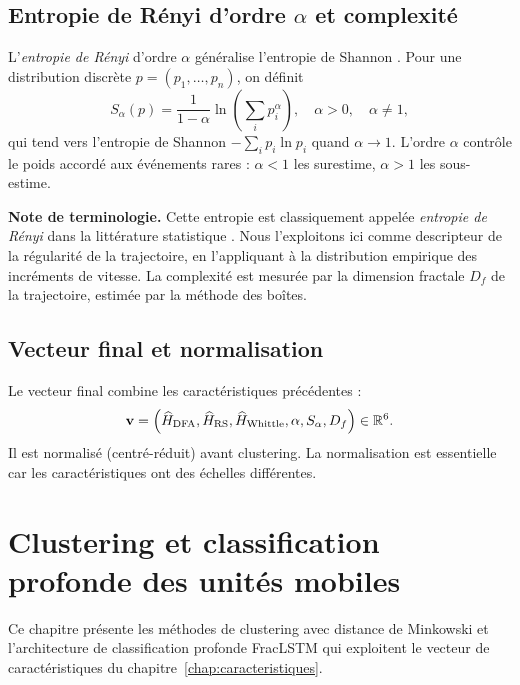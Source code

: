 \section{Entropie de Rényi d'ordre $\alpha$ et complexité}
\label{sec:entropie}
L'\emph{entropie de Rényi} d'ordre $\alpha$ généralise l'entropie de Shannon \cite{renyi1961}. Pour une distribution discrète $p = (p_1, \dots, p_n)$, on définit
\begin{equation}
S_\alpha(p) = \frac{1}{1-\alpha} \ln \left( \sum_i p_i^\alpha \right), \quad \alpha > 0, \quad \alpha \neq 1,
\end{equation}
qui tend vers l'entropie de Shannon $-\sum_i p_i \ln p_i$ quand $\alpha \to 1$. L'ordre $\alpha$ contrôle le poids accordé aux événements rares : $\alpha < 1$ les surestime, $\alpha > 1$ les sous-estime.

\medskip
\textbf{Note de terminologie.} Cette entropie est classiquement appelée \emph{entropie de Rényi} dans la littérature statistique \cite{renyi1961}. Nous l'exploitons ici comme descripteur de la régularité de la trajectoire, en l'appliquant à la distribution empirique des incréments de vitesse. La complexité est mesurée par la dimension fractale $D_f$ de la trajectoire, estimée par la méthode des boîtes.

\section{Vecteur final et normalisation}
Le vecteur final combine les caractéristiques précédentes :
\begin{equation}
\mathbf{v} = \left( \widehat{H}_{\text{DFA}}, \widehat{H}_{\text{RS}}, \widehat{H}_{\text{Whittle}}, \alpha, S_\alpha, D_f \right) \in \mathbb{R}^6.
\end{equation}
Il est normalisé (centré-réduit) avant clustering. La normalisation est essentielle car les caractéristiques ont des échelles différentes.

\chapter{Clustering et classification profonde des unités mobiles}
\label{chap:clustering_classification}

Ce chapitre présente les méthodes de clustering avec distance de Minkowski et l'architecture de classification profonde FracLSTM qui exploitent le vecteur de caractéristiques du chapitre~\ref{chap:caracteristiques}.

